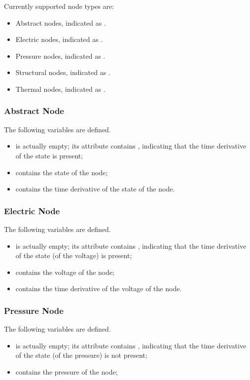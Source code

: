 Currently supported node types are:
\begin{itemize}
\item Abstract nodes, indicated as .
\item Electric nodes, indicated as .
\item Pressure nodes, indicated as .
\item Structural nodes, indicated as .
\item Thermal nodes, indicated as .
\end{itemize}


\subsubsection{Abstract Node}
\label{sec:NetCDF:Node:Abstract Node}
The following variables are defined.
\begin{itemize}
\item {} is actually empty; its  attribute contains , indicating that the time derivative of the state is present;

\item {} contains the state of the node;

\item {} contains the time derivative of the state of the node.
\end{itemize}


\subsubsection{Electric Node}
\label{sec:NetCDF:Node:Electric Node}
The following variables are defined.
\begin{itemize}
\item {} is actually empty; its  attribute contains , indicating that the time derivative of the state (of the voltage) is present;

\item {} contains the voltage of the node;

\item {} contains the time derivative of the voltage of the node.
\end{itemize}


\subsubsection{Pressure Node}
\label{sec:NetCDF:Node:Pressure Node}
The following variables are defined.
\begin{itemize}
\item {} is actually empty; its  attribute contains , indicating that the time derivative of the state (of the pressure) is not present;

\item {} contains the pressure of the node;
\end{itemize}


